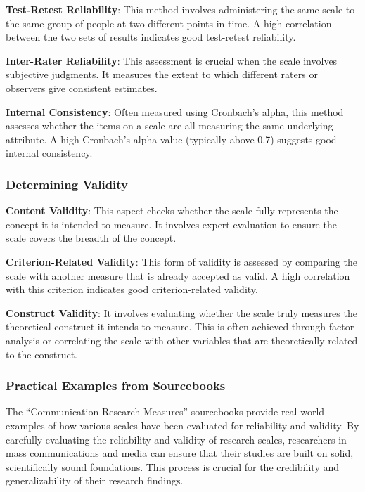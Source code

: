 \documentclass[
]{book}
\begin{document}
\textbf{Test-Retest Reliability}: This method involves administering the same scale to the same group of people at two different points in time. A high correlation between the two sets of results indicates good test-retest reliability.

\textbf{Inter-Rater Reliability}: This assessment is crucial when the scale involves subjective judgments. It measures the extent to which different raters or observers give consistent estimates.

\textbf{Internal Consistency}: Often measured using Cronbach's alpha, this method assesses whether the items on a scale are all measuring the same underlying attribute. A high Cronbach's alpha value (typically above 0.7) suggests good internal consistency.

\subsubsection*{Determining Validity}\label{determining-validity}

\textbf{Content Validity}: This aspect checks whether the scale fully represents the concept it is intended to measure. It involves expert evaluation to ensure the scale covers the breadth of the concept.

\textbf{Criterion-Related Validity}: This form of validity is assessed by comparing the scale with another measure that is already accepted as valid. A high correlation with this criterion indicates good criterion-related validity.

\textbf{Construct Validity}: It involves evaluating whether the scale truly measures the theoretical construct it intends to measure. This is often achieved through factor analysis or correlating the scale with other variables that are theoretically related to the construct.

\subsubsection*{Practical Examples from Sourcebooks}\label{practical-examples-from-sourcebooks}

The ``Communication Research Measures'' sourcebooks provide real-world examples of how various scales have been evaluated for reliability and validity. By carefully evaluating the reliability and validity of research scales, researchers in mass communications and media can ensure that their studies are built on solid, scientifically sound foundations. This process is crucial for the credibility and generalizability of their research findings.
\end{document}
